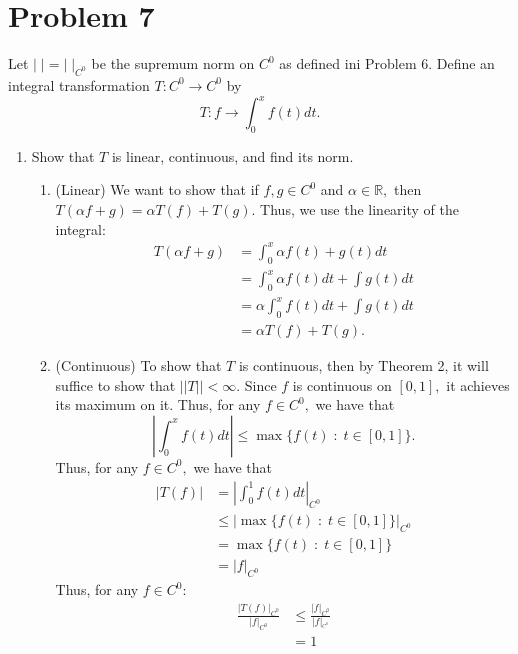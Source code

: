 \documentclass[11pt]{article}
\newcommand{\bbR}{\mathbb{R}}
\begin{document}
\newpage
\section*{Problem 7}
\begin{problem}
    Let $|\;| = |\;|_{C^0}$ be the supremum norm on $C^0$ as defined ini Problem 6. Define an integral transformation $T: C^0 \to C^0$ by 
    \[T: f \to \int_0^xf(t)dt.\]
\end{problem}
\begin{enumerate}
    \item Show that $T$ is linear, continuous, and find its norm.
    \begin{solution}
        \begin{enumerate}
            \item (Linear) We want to show that if $f,g \in C^0$ and $\alpha \in \bbR,$ then $T(\alpha f + g) = \alpha T(f) + T(g).$ Thus, we use the linearity of the integral:
            \begin{align*}
                T(\alpha f +g) &= \int_0^x \alpha f(t) + g(t)dt\\
                &= \int_0^x \alpha f(t)dt + \int g(t)dt\\
                &= \alpha\int_0^x f(t)dt + \int g(t)dt\\
                &= \alpha T(f) + T(g).
            \end{align*}
            \item (Continuous) To show that $T$ is continuous, then by Theorem 2, it will suffice to show that $||T||< \infty.$ Since $f$ is continuous on $[0,1],$ it achieves its maximum on it. Thus, for any $f\in C^0,$ we have that 
            \[\left|\int_0^xf(t)dt\right| \leq \max\{f(t)\; : \;t\in [0,1]\}.\]
            Thus, for any $f \in C^0,$ we have that 
            \begin{align*}
                |T(f)| &= |\int_0^1 f(t)dt|_{C^0}\\
                &\leq |\max\{f(t) \; : \; t\in [0,1]\}|_{C^0}\\
                &= \max\{f(t) \; : \; t\in [0,1]\}\\
                &= |f|_{C^0}
            \end{align*}
            Thus, for any $f \in C^0:$
            \begin{align*}
                \frac{|T(f)|_{C^0}}{|f|_{C^0}} &\leq \frac{|f|_{C^0}}{|f|_^{C^0}}\\
                &= 1
            \end{align*}

\end{enumerate}
\end{solution}
\end{enumerate}
\end{document}

